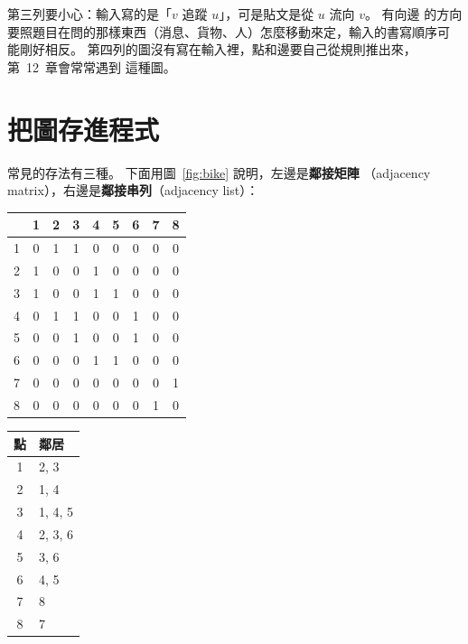 第三列要小心：輸入寫的是「$v$ 追蹤 $u$」，可是貼文是從 $u$ 流向 $v$。 有向邊
的方向要照題目在問的那樣東西（消息、貨物、人）怎麼移動來定，輸入的書寫順序可
能剛好相反。 第四列的圖沒有寫在輸入裡，點和邊要自己從規則推出來，第~12~章會常常遇到
這種圖。

\section{把圖存進程式}
\label{sec:graph-store}

常見的存法有三種。 下面用圖~\ref{fig:bike} 說明，左邊是\textbf{鄰接矩陣}
（adjacency matrix），右邊是\textbf{鄰接串列}（adjacency list）：

\begin{center}
\begin{minipage}{0.48\linewidth}
\centering
\small
\begin{tabular}{c|cccccccc}
 & 1 & 2 & 3 & 4 & 5 & 6 & 7 & 8 \\
\hline
1 & 0 & 1 & 1 & 0 & 0 & 0 & 0 & 0 \\
2 & 1 & 0 & 0 & 1 & 0 & 0 & 0 & 0 \\
3 & 1 & 0 & 0 & 1 & 1 & 0 & 0 & 0 \\
4 & 0 & 1 & 1 & 0 & 0 & 1 & 0 & 0 \\
5 & 0 & 0 & 1 & 0 & 0 & 1 & 0 & 0 \\
6 & 0 & 0 & 0 & 1 & 1 & 0 & 0 & 0 \\
7 & 0 & 0 & 0 & 0 & 0 & 0 & 0 & 1 \\
8 & 0 & 0 & 0 & 0 & 0 & 0 & 1 & 0 \\
\end{tabular}
\end{minipage}
\hfill
\begin{minipage}{0.48\linewidth}
\centering
\small
\begin{tabular}{c|l}
點 & 鄰居 \\
\hline
1 & 2, 3 \\
2 & 1, 4 \\
3 & 1, 4, 5 \\
4 & 2, 3, 6 \\
5 & 3, 6 \\
6 & 4, 5 \\
7 & 8 \\
8 & 7 \\
\end{tabular}
\end{minipage}
\label{fig:matrix-list}
\end{center}

